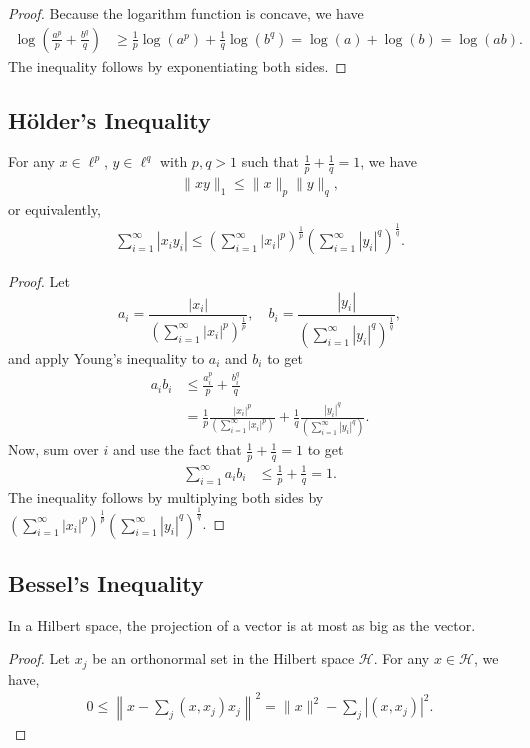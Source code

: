 \documentclass{amsart}
\theoremstyle{plain}
\numberwithin{equation}{section}
\begin{document}
\begin{proof}Because the logarithm function is concave, we have
\begin{align*}
\log\left(\frac{a^p}{p} + \frac{b^q}{q}\right) & \geq
\frac{1}{p} \log(a^p) + \frac{1}{q} \log(b^q) = \log(a) + \log(b) =
\log(ab).
\end{align*}
The inequality follows by exponentiating both sides.
\end{proof}

\subsection*{H\"{o}lder's Inequality}
For any $x \in \ell^p$, $y \in \ell^q$ with $p, q > 1$ such that 
$\frac{1}{p} + \frac{1}{q} = 1$, we have
\begin{align*}
	\|xy\|_1 \leq \|x\|_p \|y\|_q,
\end{align*}
or equivalently,
\begin{align*}
\sum_{i=1}^{\infty} |x_i y_i| \leq \left(\sum_{i=1}^{\infty} |x_i|^p\right)^{\frac{1}{p}} \left(\sum_{i=1}^{\infty} |y_i|^q\right)^{\frac{1}{q}}.
\end{align*}
\begin{proof}Let 
	$$a_i = \frac{\left|x_i\right|}{\left(\sum_{i=1}^{\infty} |x_i|^p\right)^{\frac{1}{p}}}, 
	\quad b_i = \frac{\left|y_i\right|}{\left(\sum_{i=1}^{\infty} |y_i|^q\right)^{\frac{1}{q}}},$$
	and apply Young's inequality to $a_i$ and $b_i$ to get
\begin{align*} 
	a_i b_i & \leq \frac{a_i^p}{p} + \frac{b_i^q}{q} \\
	& = \frac{1}{p}\frac{\left|x_i\right|^p}{\left(\sum_{i=1}^{\infty} |x_i|^p\right)} + 
  \frac{1}{q}\frac{\left|y_i\right|^q}{\left(\sum_{i=1}^{\infty} |y_i|^q\right)}.
\end{align*}
Now, sum over $i$ and use the fact that $\frac{1}{p} + \frac{1}{q} = 1$ to get
\begin{align*}
\sum_{i=1}^{\infty} a_i b_i & \leq \frac{1}{p} + \frac{1}{q} = 1.
\end{align*}
The inequality follows by multiplying both sides by $\left(\sum_{i=1}^{\infty} |x_i|^p\right)^{\frac{1}{p}} \left(\sum_{i=1}^{\infty} |y_i|^q\right)^{\frac{1}{q}}$.
\end{proof}

\subsection*{Bessel's Inequality}
In a Hilbert space, the projection of a vector is at most as big 
as the vector. 
\begin{proof}
Let ${x_j}$ be an orthonormal set in the Hilbert space $\mathcal{H}$.
For any $x \in \mathcal{H}$, we have, 
\begin{align*}
0 \leq \left\|x - \sum_{j}(x, x_j) x_j\right\|^2 = 
\|x\|^2 - \sum_{j}|(x, x_j)|^2.
\end{align*}
\end{proof}
\end{document}
